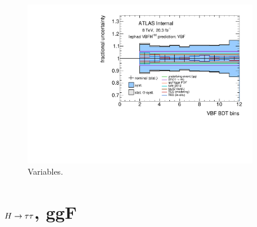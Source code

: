 \begin{figure}[tp]
  \includegraphics[width=0.90\textwidth]{figures/uncertainties/uncertainties_lephad_paper14_8TeV_VBFH125_other_VBF}
  \caption{Variables.}
  \label{fig:backgrounds-uncertainties-vbfother}
\end{figure}

\section{$H\rightarrow\tau\tau$, ggF}
\label{sec:backgrounds-ggfhtautau}

